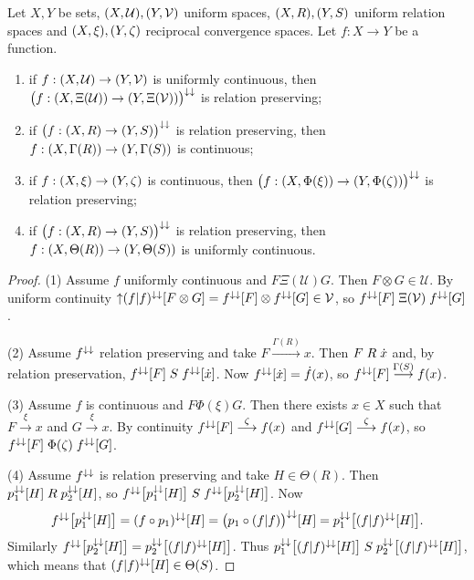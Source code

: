 \begin{proposition} \label{preservationUniformStructure}
Let $X,Y$ be sets, $\sSet{X,\mathcal{U}}, \sSet{Y,\mathcal{V}}$ uniform spaces, $\sSet{X,R}, \sSet{Y,S}$ uniform relation spaces and $\sSet{X,\xi}, \sSet{Y,\zeta}$ reciprocal convergence spaces. Let $f: X\to Y$ be a function.
\begin{enumerate}
\item if $f: \sSet{X,\mathcal{U}} \to \sSet{Y,\mathcal{V}}$ is uniformly continuous, then $\big(f: \sSet{X,\Xi(\mathcal{U})} \to \sSet{Y,\Xi(\mathcal{V})}\big)^{\imf\imf}$ is relation preserving;
\item if $\big(f: \sSet{X,R} \to \sSet{Y,S}\big)^{\imf\imf}$ is relation preserving, then $f: \sSet{X,\Gamma(R)} \to \sSet{Y,\Gamma(S)}$ is continuous;
\item if $f: \sSet{X,\xi} \to \sSet{Y,\zeta}$ is continuous, then $\big(f: \sSet{X,\Phi(\xi)} \to \sSet{Y,\Phi(\zeta)}\big)^{\imf\imf}$ is relation preserving;
\item if $\big(f: \sSet{X,R} \to \sSet{Y,S}\big)^{\imf\imf}$ is relation preserving, then $f: \sSet{X,\Theta(R)} \to \sSet{Y,\Theta(S)}$ is uniformly continuous.
\end{enumerate}

\end{proposition}
\begin{proof}
(1) Assume $f$ uniformly continuous and $F\mathrel{\Xi(\mathcal{U})} G$. Then $F\otimes G\in \mathcal{U}$. By uniform continuity $\operatorname{\uparrow} (f|f)^{\downarrow\downarrow}[F\otimes G] = f^{\downarrow\downarrow}[F] \otimes f^{\downarrow\downarrow}[G] \in \mathcal{V}$, so $f^{\downarrow\downarrow}[F] \mathrel{\Xi(\mathcal{V})} f^{\downarrow\downarrow}[G]$.

(2) Assume $f^{\downarrow\downarrow}$ relation preserving and take $F \overset{\Gamma(R)}{\longrightarrow} x$. Then $F\mathrel{R}\dot{x}$ and, by relation preservation, $f^{\downarrow\downarrow}[F]\mathrel{S}f^{\downarrow\downarrow}[\dot{x}]$. Now $f^{\downarrow\downarrow}[\dot{x}] = \dot{f}(x)$, so $f^{\downarrow\downarrow}[F] \overset{\Gamma(S)}{\longrightarrow} f(x)$.

(3) Assume $f$ is continuous and $F\mathrel{\Phi(\xi)} G$. Then there exists $x\in X$ such that $F\overset{\xi}{\longrightarrow} x$ and $G\overset{\xi}{\longrightarrow} x$. By continuity $f^{\downarrow\downarrow}[F]\overset{\zeta}{\longrightarrow} f(x)$ and $f^{\downarrow\downarrow}[G]\overset{\zeta}{\longrightarrow} f(x)$, so $f^{\downarrow\downarrow}[F] \mathrel{\Phi(\zeta)} f^{\downarrow\downarrow}[G]$.

(4) Assume $f^{\downarrow\downarrow}$ is relation preserving and take $H\in \Theta(R)$. Then $p_1^{\downarrow\downarrow}[H]\mathrel{R}p_2^{\downarrow\downarrow}[H]$, so $f^{\downarrow\downarrow}\big[p_1^{\downarrow\downarrow}[H]\big]\mathrel{S}f^{\downarrow\downarrow}\big[p_2^{\downarrow\downarrow}[H]\big]$. Now
\[ f^{\downarrow\downarrow}\big[p_1^{\downarrow\downarrow}[H]\big] = (f\circ p_1)^{\downarrow\downarrow}[H] = \big(p_1\circ(f|f) \big)^{\downarrow\downarrow}[H] = p_1^{\downarrow\downarrow}\big[(f|f)^{\downarrow\downarrow}[H]\big]. \]
Similarly $f^{\downarrow\downarrow}\big[p_2^{\downarrow\downarrow}[H]\big] = p_2^{\downarrow\downarrow}\big[(f|f)^{\downarrow\downarrow}[H]\big]$. Thus $p_1^{\downarrow\downarrow}\big[(f|f)^{\downarrow\downarrow}[H]\big]\mathrel{S}p_2^{\downarrow\downarrow}\big[(f|f)^{\downarrow\downarrow}[H]\big]$, which means that $(f|f)^{\downarrow\downarrow}[H]\in \Theta(S)$.
\end{proof}
